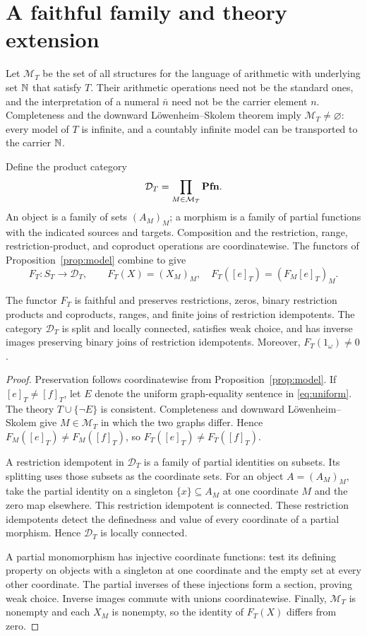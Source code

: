 \section{A faithful family and theory extension}\label{sec:family}

Let $\mathcal M_T$ be the set of all structures for the language of
arithmetic with underlying set $\mathbb N$ that satisfy $T$. Their arithmetic
operations need not be the standard ones, and the interpretation of a
numeral $\bar n$ need not be the carrier element $n$. Completeness and
the downward L\"owenheim--Skolem theorem imply
$\mathcal M_T\ne\varnothing$: every model of $T$ is infinite, and a
countably infinite model can be transported to the carrier $\mathbb N$.

Define the product category
\[
 \mathcal D_T=\prod_{M\in\mathcal M_T}\mathbf{Pfn}.
\]
An object is a family of sets $(A_M)_M$; a morphism is a family of partial
functions with the indicated sources and targets. Composition and the
restriction, range, restriction-product, and coproduct operations are coordinatewise.
The functors of Proposition~\ref{prop:model} combine to give
\[
 F_T:S_T\longrightarrow\mathcal D_T,\qquad
 F_T(X)=(X_M)_M,\quad F_T([e]_T)=(F_M[e]_T)_M.
\]

\begin{theorem}\label{thm:faithful}
The functor $F_T$ is faithful and preserves restrictions, zeros, binary
restriction products and coproducts, ranges, and finite joins of
restriction idempotents. The category
$\mathcal D_T$ is split and locally connected, satisfies weak choice,
and has inverse images preserving binary joins of restriction
idempotents. Moreover,
$F_T(1_\omega)\ne0$.
\end{theorem}
\begin{proof}
Preservation follows coordinatewise from Proposition~\ref{prop:model}.
If $[e]_T\ne[f]_T$, let $E$ denote the uniform graph-equality sentence
in \eqref{eq:uniform}. The theory $T\cup\{\neg E\}$ is consistent.
Completeness and downward L\"owenheim--Skolem give
$M\in\mathcal M_T$ in which the two graphs differ. Hence
$F_M([e]_T)\ne F_M([f]_T)$, so $F_T([e]_T)\ne F_T([f]_T)$.

A restriction idempotent in $\mathcal D_T$ is a family of partial
identities on subsets. Its splitting uses those subsets as the
coordinate sets. For an object $A=(A_M)_M$, take the partial identity
on a singleton $\{x\}\subseteq A_M$ at one coordinate $M$ and the zero
map elsewhere. This restriction idempotent is connected. These
restriction idempotents detect the definedness and value of every coordinate of a partial morphism. Hence
$\mathcal D_T$ is locally connected.

A partial monomorphism has injective coordinate functions: test its
defining property on objects with a singleton at one coordinate
and the empty set at every other coordinate.
The partial inverses of these injections form a section, proving weak
choice. Inverse images commute with unions coordinatewise. Finally,
$\mathcal M_T$ is nonempty and each $X_M$ is nonempty, so the
identity of $F_T(X)$ differs from zero.
\end{proof}

